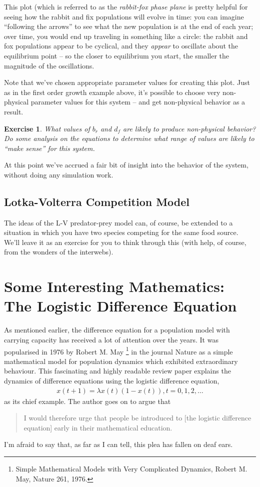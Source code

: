 \documentclass{tufte-handout}
\newtheorem{del}{Exercise}
\begin{document}
This plot (which is referred to as the {\it rabbit-fox phase plane} is pretty helpful for seeing how the rabbit and fix populations will evolve in time:  you can imagine ``following the arrows'' to see what the new population is at the end of each year; over time, you would end up traveling in something like a circle:  the rabbit and fox populations appear to be cyclical, and they {\it appear} to oscillate about the equilibrium point -- so the closer to equilibrium you start, the smaller the magnitude of the oscillations.

Note that we've chosen appropriate parameter values for creating this plot.  Just as in the first order growth example above, it's possible to choose very non-physical parameter values for this system -- and get non-physical behavior as a result.


\begin{del}
What values of $b_r$ and $d_f$ are likely to produce non-physical behavior?  Do some analysis on the equations to determine what range of values are likely to ``make sense'' for this system.
\end{del}

At this point we've accrued a fair bit of insight into the behavior of the system, without doing any simulation work.  

\subsection*{Lotka-Volterra Competition Model}

The ideas of the L-V predator-prey model can, of course, be extended to a situation in which you have two species competing for the same food source.  We'll leave it as an exercise for you to think through this (with help, of course, from the wonders of the interwebs).


\section*{Some Interesting Mathematics: The Logistic Difference Equation}

As mentioned earlier, the difference equation for a population model with carrying capacity has received a lot of attention over the years. It was popularised in 1976 by Robert M. May \footnote{Simple Mathematical Models with Very Complicated Dynamics, Robert M. May, Nature 261, 1976.} in the journal Nature as a simple mathematical model for population dynamics which exhibited extraordinary behaviour. This fascinating and highly readable review paper explains the dynamics of difference equations using the logistic difference equation,
\begin{eqnarray}
x(t+1) = \lambda x(t) (1 - x(t)), t = 0, 1, 2, \ldots
\end{eqnarray}
as its chief example. The author goes on to argue that
\begin{quote}
I would therefore urge that people be introduced to [the logistic difference equation] early in their mathematical education.
\end{quote}
I'm afraid to say that, as far as I can tell, this plea has fallen on deaf ears.
\end{document}
